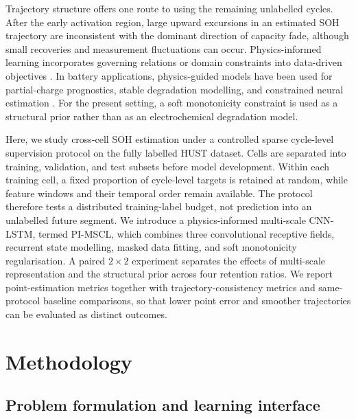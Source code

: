 \documentclass[pdflatex,sn-mathphys-num]{sn-jnl}
\begin{document}
Trajectory structure offers one route to using the remaining unlabelled cycles. After the early activation region, large upward excursions in an estimated SOH trajectory are inconsistent with the dominant direction of capacity fade, although small recoveries and measurement fluctuations can occur. Physics-informed learning incorporates governing relations or domain constraints into data-driven objectives \cite{raissi2019physics,karniadakis2021physics}. In battery applications, physics-guided models have been used for partial-charge prognostics, stable degradation modelling, and constrained neural estimation \cite{kohtz2022physics,wang2024physics,ye2024method,wen2023physics}. For the present setting, a soft monotonicity constraint is used as a structural prior rather than as an electrochemical degradation model.

Here, we study cross-cell SOH estimation under a controlled sparse cycle-level supervision protocol on the fully labelled HUST dataset. Cells are separated into training, validation, and test subsets before model development. Within each training cell, a fixed proportion of cycle-level targets is retained at random, while feature windows and their temporal order remain available. The protocol therefore tests a distributed training-label budget, not prediction into an unlabelled future segment. We introduce a physics-informed multi-scale CNN-LSTM, termed PI-MSCL, which combines three convolutional receptive fields, recurrent state modelling, masked data fitting, and soft monotonicity regularisation. A paired $2\times2$ experiment separates the effects of multi-scale representation and the structural prior across four retention ratios. We report point-estimation metrics together with trajectory-consistency metrics and same-protocol baseline comparisons, so that lower point error and smoother trajectories can be evaluated as distinct outcomes.

\section{Methodology}
\label{sec:methodology}

\subsection{Problem formulation and learning interface}
\label{subsec:problem_formulation}
\end{document}
